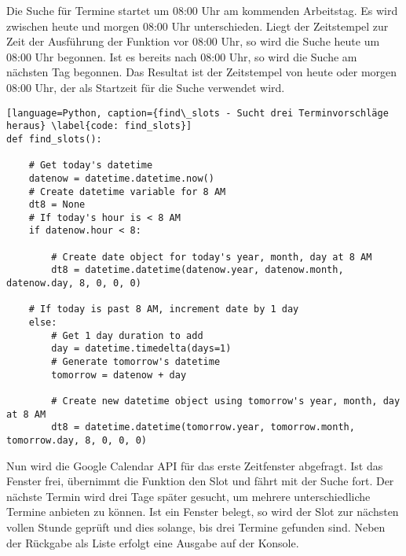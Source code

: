                 Die Suche für Termine startet um 08:00 Uhr am kommenden Arbeitstag. Es wird zwischen heute und morgen 08:00 Uhr unterschieden. Liegt der Zeitstempel zur Zeit der Ausführung der Funktion vor 08:00 Uhr, so wird die Suche heute um 08:00 Uhr begonnen. Ist es bereits nach 08:00 Uhr, so wird die Suche am nächsten Tag begonnen. Das Resultat ist der Zeitstempel von heute oder morgen 08:00 Uhr, der als Startzeit für die Suche verwendet wird.

            \begin{lstlisting}[language=Python, caption={find\_slots - Sucht drei Terminvorschläge heraus} \label{code: find_slots}]
def find_slots():

    # Get today's datetime
    datenow = datetime.datetime.now()
    # Create datetime variable for 8 AM
    dt8 = None
    # If today's hour is < 8 AM
    if datenow.hour < 8:

        # Create date object for today's year, month, day at 8 AM
        dt8 = datetime.datetime(datenow.year, datenow.month, datenow.day, 8, 0, 0, 0)

    # If today is past 8 AM, increment date by 1 day
    else:
        # Get 1 day duration to add
        day = datetime.timedelta(days=1)
        # Generate tomorrow's datetime
        tomorrow = datenow + day

        # Create new datetime object using tomorrow's year, month, day at 8 AM
        dt8 = datetime.datetime(tomorrow.year, tomorrow.month, tomorrow.day, 8, 0, 0, 0)
            \end{lstlisting}

            Nun wird die Google Calendar API für das erste Zeitfenster abgefragt. Ist das Fenster frei, übernimmt die Funktion den Slot und fährt mit der Suche fort. Der nächste Termin wird drei Tage später gesucht, um mehrere unterschiedliche Termine anbieten zu können. Ist ein Fenster belegt, so wird der Slot zur nächsten vollen Stunde geprüft und dies solange, bis drei Termine gefunden sind. Neben der Rückgabe als Liste erfolgt eine Ausgabe auf der Konsole.

